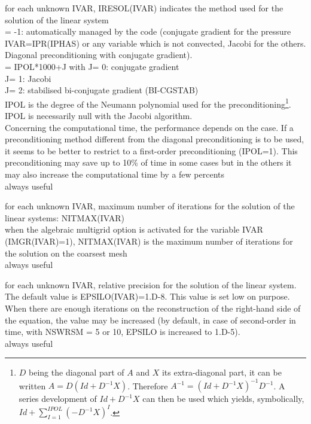 {for each unknown IVAR, IRESOL(IVAR) indicates the method used for the solution of
the linear system\\ 
\hspace*{1.3cm}= -1: automatically managed by the code (conjugate
gradient for the pressure IVAR=IPR(IPHAS) or any variable which is not
convected, Jacobi for the others. Diagonal preconditioning with
conjugate gradient).\\ 
\hspace*{1.3cm}= IPOL*1000+J with           J= 0: conjugate gradient\\
\hspace*{1.3cm}\phantom{= IPOL*1000+J with} J= 1: Jacobi\\
\hspace*{1.3cm}\phantom{= IPOL*1000+J with} J= 2: stabilised bi-conjugate
gradient (BI-CGSTAB)\\
\hspace*{1.3cm}IPOL is the degree of the Neumann polynomial used for the
preconditioning\footnote{$D$ being the diagonal part of $A$ and $X$ its
extra-diagonal part, it can be written
$A=D(Id+D^{-1}X)$. Therefore \mbox{$A^{-1}=(Id+D^{-1}X)^{-1}D^{-1}$}. A series
development of $Id+D^{-1}X$ can then be used which yields, symbolically,
\mbox{$Id+\sum\limits_{I=1}^{IPOL}\left(-D^{-1}X\right)^{I}$}.}.\\
IPOL is necessarily null with the Jacobi algorithm.\\
Concerning the computational time, the performance depends on the
case. If a preconditioning method different from
the diagonal preconditioning is to be used, it seems to be better to restrict
to a first-order preconditioning (IPOL=1). This preconditioning may save up to 10\%
of time in some cases but in the others it may also increase the computational
time by a few percents\\ 
always useful}

{for each unknown IVAR, maximum number of iterations for the solution of
the linear systems: NITMAX(IVAR)\\
when the algebraic multigrid option is activated for the variable IVAR
(IMGR(IVAR)=1), NITMAX(IVAR) is the maximum number of iterations for the
solution on the coarsest mesh\\
always useful}

{for each unknown IVAR, relative precision for the solution of the linear
system. The default value is EPSILO(IVAR)=1.D-8. This value is set low
on purpose. When there are enough iterations on the reconstruction of the
right-hand side of the equation,
the value may be increased (by default, in case of second-order in time,
with NSWRSM = 5 or 10, EPSILO is increased to 1.D-5).\\ 
always useful}

